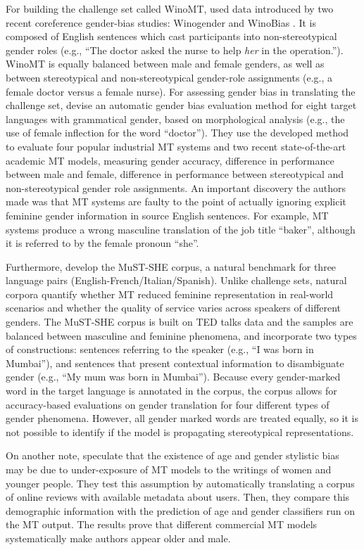 For building the challenge set called WinoMT, \citet{Stanovsky_2019} used data introduced by two recent coreference gender-bias studies: Winogender \parencite{Rudinger_2018_coreference} and WinoBias \parencite{Zhao_2018_coreference}. It is composed of English sentences which cast participants into non-stereotypical gender roles (e.g., “The doctor asked the nurse to help \textit{her} in the operation.”). WinoMT is equally balanced between male and female genders, as well as between stereotypical and non-stereotypical gender-role assignments (e.g., a female doctor versus a female nurse). 
For assessing gender bias in translating the challenge set, \citet{Stanovsky_2019} devise an automatic gender bias evaluation method for eight target languages with grammatical gender, based on morphological analysis (e.g., the use of female inflection for the word “doctor”). They use the developed method to evaluate four popular industrial MT systems and two recent state-of-the-art academic MT models, measuring gender accuracy, difference in performance between male and female, difference in performance between stereotypical and non-stereotypical gender role assignments. An important discovery the authors made was that MT systems are faulty to the point of actually ignoring explicit feminine gender information in source English sentences. For example, MT systems produce a wrong masculine translation of the job title “baker”, although it is referred to by the female pronoun “she”.

Furthermore, \citet{MuST-SHE} develop the MuST-SHE corpus, a natural benchmark for three language pairs (English-French/Italian/Spanish). Unlike challenge sets, natural corpora quantify whether MT reduced feminine representation in real-world scenarios and whether the quality of service varies across speakers of different genders. The MuST-SHE corpus is built on  TED talks data and the samples are balanced between masculine and feminine phenomena, and incorporate two types of constructions: sentences referring to the speaker (e.g., “I was born in Mumbai”), and sentences that present contextual information to disambiguate gender (e.g., “My mum was born in Mumbai”). Because every gender-marked word in the target language is annotated in the corpus, the corpus allows for accuracy-based evaluations on gender translation for four different types of gender phenomena. However, all gender marked words are treated equally, so it is not possible to identify if the model is propagating stereotypical representations.

On another note, \citet{Hovy_2020} speculate that the existence of age and gender stylistic bias may be due to under-exposure of MT models to the writings of women and younger people. They test this assumption by automatically translating a corpus of online reviews with available metadata about users. Then, they compare this demographic information with the prediction of age and gender classifiers run on the MT output. The results prove that different commercial MT models systematically make authors appear older and male.

